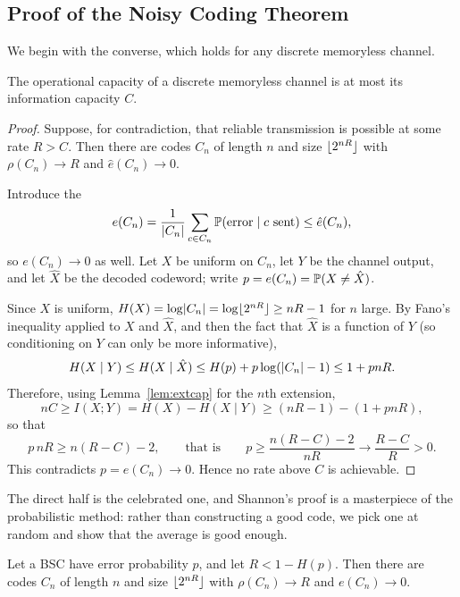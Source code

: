 \documentclass[a4paper]{scrartcl}
\DeclarePairedDelimiter{\floor}{\lfloor}{\rfloor}
\begin{document}
\subsection{Proof of the Noisy Coding Theorem}\label{sec:noisycoding}

We begin with the converse, which holds for any discrete memoryless channel.

\begin{proposition}
	The operational capacity of a discrete memoryless channel is at most its information capacity $C$.
\end{proposition}

\begin{proof}
	Suppose, for contradiction, that reliable transmission is possible at some rate $R > C$. Then there are codes $C_n$ of length $n$ and size $\floor{2^{nR}}$ with $\rho(C_n)\to R$ and $\hat e(C_n)\to0$.

	Introduce the 
	$$e(C_n) = \frac{1}{\lvert C_n\rvert}\sum_{c\in C_n}\mathbb{P}(\text{error}\mid c\text{ sent}) \le \hat e(C_n),$$
	so $e(C_n)\to0$ as well. Let $X$ be uniform on $C_n$, let $Y$ be the channel output, and let $\hat X$ be the decoded codeword; write $p = e(C_n) = \mathbb{P}(X \ne \hat X)$.

	Since $X$ is uniform, $H(X) = \log\abs{C_n} = \log\floor{2^{nR}} \ge nR-1$ for $n$ large. By Fano's inequality applied to $X$ and $\hat X$, and then the fact that $\hat X$ is a function of $Y$ (so conditioning on $Y$ can only be more informative),
	$$H(X\mid Y) \le H(X \mid \hat X) \le H(p)+p\log(\lvert C_n\rvert-1) \le 1 + pnR.$$
	Therefore, using Lemma~\ref{lem:extcap} for the $n$th extension,
	$$nC \ge I(X;Y) = H(X)-H(X\mid Y) \ge (nR-1)-(1+pnR),$$
	so that
	$$p\,nR \ge n(R-C)-2, \qquad\text{that is}\qquad p \ge \frac{n(R-C)-2}{nR} \longrightarrow \frac{R-C}{R} > 0.$$
	This contradicts $p = e(C_n)\to0$. Hence no rate above $C$ is achievable.
\end{proof}

The direct half is the celebrated one, and Shannon's proof is a masterpiece of the probabilistic method: rather than constructing a good code, we pick one at random and show that the average is good enough.

\begin{proposition}\label{prop:randomcoding}
	Let a BSC have error probability $p$, and let $R < 1-H(p)$. Then there are codes $C_n$ of length $n$ and size $\floor{2^{nR}}$ with $\rho(C_n)\to R$ and $e(C_n)\to0$.
\end{proposition}
\end{document}
